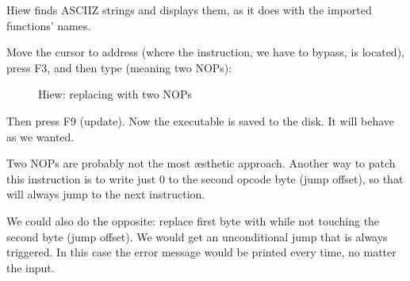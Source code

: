 Hiew finds \ac{ASCIIZ} strings and displays them, as it does with the imported functions' names.

\clearpage
Move the cursor to address  (where the  instruction, we have to bypass, is located), press F3, and then type  (meaning two \ac{NOP}s):

\begin{figure}[H]
\centering
{}
\caption{Hiew: replacing  with two \ac{NOP}s}
\label{fig:scanf_ex3_hiew_2}
\end{figure}

Then press F9 (update). Now the executable is saved to the disk. It will behave as we wanted.

Two \ac{NOP}s are probably not the most \ae{}sthetic approach.
Another way to patch this instruction is to write just 0 to the second opcode byte (\gls{jump offset}), 
so that  will always jump to the next instruction.

We could also do the opposite: replace first byte with  while not touching the second byte (\gls{jump offset}).
We would get an unconditional jump that is always triggered.
In this case the error message would be printed every time, no matter the input.

